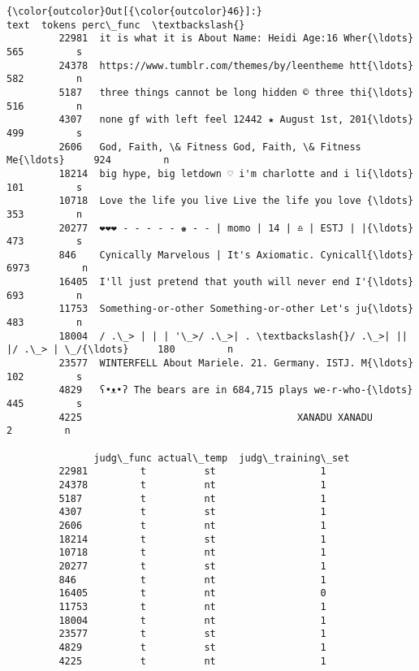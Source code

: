 \documentclass[11pt]{article}
\begin{document}
\begin{Verbatim}[commandchars=\\\{\}]
{\color{outcolor}Out[{\color{outcolor}46}]:}                                                     text  tokens perc\_func  \textbackslash{}
         22981  it is what it is About Name: Heidi Age:16 Wher{\ldots}     565         s   
         24378  https://www.tumblr.com/themes/by/leentheme htt{\ldots}     582         n   
         5187   three things cannot be long hidden © three thi{\ldots}     516         n   
         4307   none gf with left feel 12442 ★ August 1st, 201{\ldots}     499         s   
         2606   God, Faith, \& Fitness God, Faith, \& Fitness Me{\ldots}     924         n   
         18214  big hype, big letdown ♡ i'm charlotte and i li{\ldots}     101         s   
         10718  Love the life you live Live the life you love {\ldots}     353         n   
         20277  ❤❤❤ - - - - - ♚ - - | momo | 14 | ♎ | ESTJ | |{\ldots}     473         s   
         846    Cynically Marvelous | It's Axiomatic. Cynicall{\ldots}    6973         n   
         16405  I'll just pretend that youth will never end I'{\ldots}     693         n   
         11753  Something-or-other Something-or-other Let's ju{\ldots}     483         n   
         18004  / .\_> | | | '\_>/ .\_>| . \textbackslash{}/ .\_>| || |/ .\_> | \_/{\ldots}     180         n   
         23577  WINTERFELL About Mariele. 21. Germany. ISTJ. M{\ldots}     102         s   
         4829   ʕ•ᴥ•ʔ The bears are in 684,715 plays we-r-who-{\ldots}     445         s   
         4225                                     XANADU XANADU         2         n   
         
               judg\_func actual\_temp  judg\_training\_set  
         22981         t          st                  1  
         24378         t          nt                  1  
         5187          t          nt                  1  
         4307          t          st                  1  
         2606          t          nt                  1  
         18214         t          st                  1  
         10718         t          nt                  1  
         20277         t          st                  1  
         846           t          nt                  1  
         16405         t          nt                  0  
         11753         t          nt                  1  
         18004         t          nt                  1  
         23577         t          st                  1  
         4829          t          st                  1  
         4225          t          nt                  1  
\end{Verbatim}
            
\end{document}

